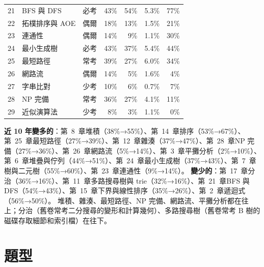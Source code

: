 {\begin{longtable}{rlcrrrr}
21 & BFS 與 DFS & 必考 & 43\% & 54\% & 5.3\% & 77\% \\
22 & 拓樸排序與 AOE & 偶爾 & 18\% & 13\% & 1.5\% & 21\% \\
23 & 連通性 & 偶爾 & 14\% & 9\% & 1.1\% & 30\% \\
24 & 最小生成樹 & 必考 & 43\% & 37\% & 5.4\% & 44\% \\
25 & 最短路徑 & 常考 & 39\% & 27\% & 6.0\% & 34\% \\
26 & 網路流 & 偶爾 & 14\% & 5\% & 1.6\% & 4\% \\
27 & 字串比對 & 少考 & 10\% & 6\% & 0.7\% & 7\% \\
28 & NP 完備 & 常考 & 36\% & 27\% & 4.1\% & 11\% \\
29 & 近似演算法 & 少考 & 8\% & 3\% & 1.1\% & 0\% \\
\bottomrule
\end{longtable}}

\textbf{近 10 年變多的}：第~8~章堆積（38\%→55\%）、第~14~章排序（53\%→67\%）、第~25~章最短路徑（27\%→39\%）、第~12~章雜湊（37\%→47\%）、第~28~章NP 完備（27\%→36\%）、第~26~章網路流（5\%→14\%）、第~3~章平攤分析（2\%→10\%）、第~6~章堆疊與佇列（44\%→51\%）、第~24~章最小生成樹（37\%→43\%）、第~7~章樹與二元樹（55\%→60\%）、第~23~章連通性（9\%→14\%）。 \textbf{變少的}：第~17~章分治（36\%→16\%）、第~11~章多路搜尋樹與 trie（32\%→16\%）、第~21~章BFS 與 DFS（54\%→43\%）、第~15~章下界與線性排序（35\%→26\%）、第~2~章遞迴式（56\%→50\%）。 堆積、雜湊、最短路徑、NP 完備、網路流、平攤分析都在往上；分治（舊卷常考二分搜尋的變形和計算幾何）、多路搜尋樹（舊卷常考 B 樹的磁碟存取細節和索引檔）在往下。

\section*{題型}

\begin{center}
\end{center}

